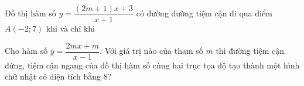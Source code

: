 \BTTL
\begin{ex}%
    Đồ thị hàm số $y=\dfrac{(2m+1)x+3}{x+1}$ có đường đường tiệm cận đi qua điểm $A(-2;7)$ khi và chỉ khi
\end{ex}
\begin{ex}%
    Cho hàm số $ y=\dfrac{2mx+m}{x-1}$. Với giá trị nào của tham số $m$ thì đường tiệm cận đứng, tiệm cận ngang của đồ thị hàm số cùng hai trục tọa độ tạo thành một hình chữ nhật có diện tích bằng $8$?
\end{ex}

